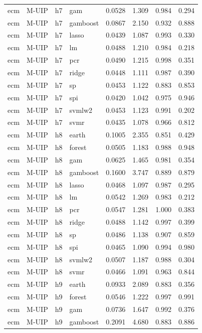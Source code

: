 \begin{ThreePartTable}
\begin{longtable}[t]{llclcccc}
ecm & M-UIP & h7 & gam & 0.0528 & 1.309 & 0.984 & 0.294\\
ecm & M-UIP & h7 & gamboost & 0.0867 & 2.150 & 0.932 & 0.888\\
ecm & M-UIP & h7 & lasso & 0.0439 & 1.087 & 0.993 & 0.330\\
ecm & M-UIP & h7 & lm & 0.0488 & 1.210 & 0.984 & 0.218\\
ecm & M-UIP & h7 & pcr & 0.0490 & 1.215 & 0.998 & 0.351\\
ecm & M-UIP & h7 & ridge & 0.0448 & 1.111 & 0.987 & 0.390\\
ecm & M-UIP & h7 & sp & 0.0453 & 1.122 & 0.883 & 0.853\\
ecm & M-UIP & h7 & spi & 0.0420 & 1.042 & 0.975 & 0.946\\
ecm & M-UIP & h7 & svmlw2 & 0.0453 & 1.123 & 0.991 & 0.202\\
ecm & M-UIP & h7 & svmr & 0.0435 & 1.078 & 0.966 & 0.812\\
\addlinespace
ecm & M-UIP & h8 & earth & 0.1005 & 2.355 & 0.851 & 0.429\\
ecm & M-UIP & h8 & forest & 0.0505 & 1.183 & 0.988 & 0.948\\
ecm & M-UIP & h8 & gam & 0.0625 & 1.465 & 0.981 & 0.354\\
ecm & M-UIP & h8 & gamboost & 0.1600 & 3.747 & 0.889 & 0.879\\
ecm & M-UIP & h8 & lasso & 0.0468 & 1.097 & 0.987 & 0.295\\
ecm & M-UIP & h8 & lm & 0.0542 & 1.269 & 0.983 & 0.212\\
ecm & M-UIP & h8 & pcr & 0.0547 & 1.281 & 1.000 & 0.383\\
ecm & M-UIP & h8 & ridge & 0.0488 & 1.142 & 0.997 & 0.399\\
ecm & M-UIP & h8 & sp & 0.0486 & 1.138 & 0.907 & 0.859\\
ecm & M-UIP & h8 & spi & 0.0465 & 1.090 & 0.994 & 0.980\\
ecm & M-UIP & h8 & svmlw2 & 0.0507 & 1.187 & 0.988 & 0.304\\
ecm & M-UIP & h8 & svmr & 0.0466 & 1.091 & 0.963 & 0.844\\
\addlinespace
ecm & M-UIP & h9 & earth & 0.0933 & 2.089 & 0.883 & 0.356\\
ecm & M-UIP & h9 & forest & 0.0546 & 1.222 & 0.997 & 0.991\\
ecm & M-UIP & h9 & gam & 0.0736 & 1.647 & 0.992 & 0.376\\
ecm & M-UIP & h9 & gamboost & 0.2091 & 4.680 & 0.883 & 0.886\\

\end{longtable}
\end{ThreePartTable}
